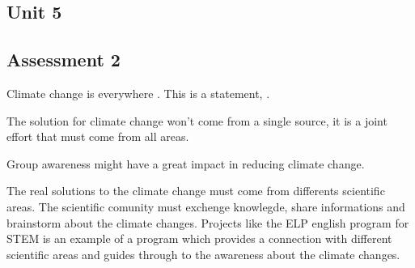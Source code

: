 \documentclass[11pt]{report}
\begin{document}
\begin{mainf} %
\chapter{Unit 5}
\section*{Assessment 2}
    Climate change is everywhere \cite{behrens_lemuridae_2016}.
    This is a statement, \cite{lake_white_1979}.
    
    The solution for climate change won't come from a single source, it is a joint effort that must come from all areas.

    Group awareness might have a great impact in reducing climate change.

The real solutions to the climate change must come from differents scientific areas. The scientific comunity must exchenge knowlegde, share informations and brainstorm about the climate changes. Projects like the ELP english program for STEM is an example of a program which provides a connection with different scientific areas and guides through to the awareness about the climate changes.
\end{mainf}


\begin{bibliof}

\end{bibliof}
\end{document}
